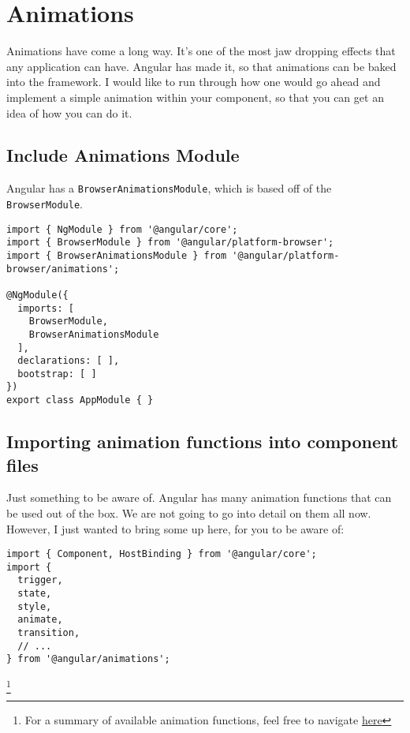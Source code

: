 \maketitle{}
\section{ Animations }

Animations have come a long way. It's one of the most jaw dropping effects
that any application can have. Angular has made it, so that animations can be
baked into the framework. I would like to run through how one would go ahead
and implement a simple animation within your component, so that you can get an 
idea of how you can do it. 

\subsection{ Include Animations Module }
Angular has a \lstinline{BrowserAnimationsModule}, which is based off of the 
\lstinline{BrowserModule}.

\begin{lstlisting}[caption=app.module.ts]
import { NgModule } from '@angular/core';
import { BrowserModule } from '@angular/platform-browser';
import { BrowserAnimationsModule } from '@angular/platform-browser/animations';

@NgModule({
  imports: [
    BrowserModule,
    BrowserAnimationsModule
  ],
  declarations: [ ],
  bootstrap: [ ]
})
export class AppModule { }  
\end{lstlisting}

\subsection{ Importing animation functions into component files }
Just something to be aware of. Angular has many animation functions that can
be used out of the box. We are not going to go into detail on them all now. 
However, I just wanted to bring some up here, for you to be aware of: 
\begin{lstlisting}[caption=app.component.ts]
import { Component, HostBinding } from '@angular/core';
import {
  trigger,
  state,
  style,
  animate,
  transition,
  // ...
} from '@angular/animations';  
\end{lstlisting}

\footnote{For a summary of available animation functions, feel free to navigate 
\href{https://angular.io/guide/animations\#animation-api-summary}{here}}

